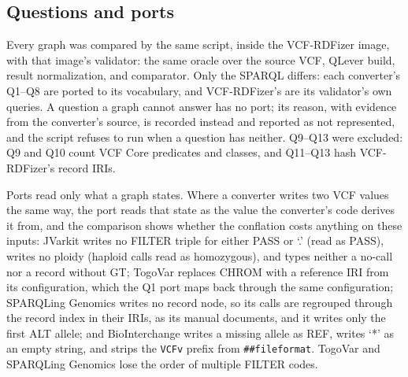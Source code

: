 \documentclass[11pt]{article}
\begin{document}
\subsection{Questions and ports}\label{subsec:converters-ports}
Every graph was compared by the same script, inside the VCF-RDFizer image, with that image's validator: the same oracle over the source VCF, QLever build, result normalization, and comparator.
Only the SPARQL differs: each converter's Q1--Q8 are ported to its vocabulary, and VCF-RDFizer's are its validator's own queries.
A question a graph cannot answer has no port; its reason, with evidence from the converter's source, is recorded instead and reported as not represented, and the script refuses to run when a question has neither.
Q9--Q13 were excluded: Q9 and Q10 count VCF Core predicates and classes, and Q11--Q13 hash VCF-RDFizer's record IRIs.

Ports read only what a graph states.
Where a converter writes two VCF values the same way, the port reads that state as the value the converter's code derives it from, and the comparison shows whether the conflation costs anything on these inputs:
JVarkit writes no FILTER triple for either PASS or `.' (read as PASS), writes no ploidy (haploid calls read as homozygous), and types neither a no-call nor a record without GT;
TogoVar replaces CHROM with a reference IRI from its configuration, which the Q1 port maps back through the same configuration;
SPARQLing Genomics writes no record node, so its calls are regrouped through the record index in their IRIs, as its manual documents, and it writes only the first ALT allele;
and BioInterchange writes a missing allele as REF, writes `*' as an empty string, and strips the \texttt{VCFv} prefix from \texttt{\#\#fileformat}.
TogoVar and SPARQLing Genomics lose the order of multiple FILTER codes.
\end{document}
